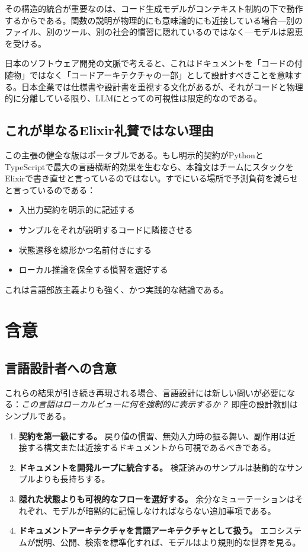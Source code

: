 \documentclass[11pt]{article}
\newcommand{\elixir}{Elixir}
\newcommand{\pythonlang}{Python}
\newcommand{\tslang}{TypeScript}
\begin{document}
その構造的統合が重要なのは、コード生成モデルがコンテキスト制約の下で動作するからである。関数の説明が物理的にも意味論的にも近接している場合---別のファイル、別のツール、別の社会的慣習に隠れているのではなく---モデルは恩恵を受ける\cite{zachdaniel}。

日本のソフトウェア開発の文脈で考えると、これはドキュメントを「コードの付随物」ではなく「コードアーキテクチャの一部」として設計すべきことを意味する。日本企業では仕様書や設計書を重視する文化があるが、それがコードと物理的に分離している限り、LLMにとっての可視性は限定的なのである。

\subsection{これが単なるElixir礼賛ではない理由}

この主張の健全な版はポータブルである。もし明示的契約が\pythonlang{}と\tslang{}で最大の言語横断的効果を生むなら、本論文はチームにスタックを\elixir{}で書き直せと言っているのではない。すでにいる場所で予測負荷を減らせと言っているのである：
\begin{itemize}
  \item 入出力契約を明示的に記述する
  \item サンプルをそれが説明するコードに隣接させる
  \item 状態遷移を線形かつ名前付きにする
  \item ローカル推論を保全する慣習を選好する
\end{itemize}

これは言語部族主義よりも強く、かつ実践的な結論である。

\section{含意}

\subsection{言語設計者への含意}

これらの結果が引き続き再現される場合、言語設計には新しい問いが必要になる：\emph{この言語はローカルビューに何を強制的に表示するか？} 即座の設計教訓はシンプルである。

\begin{enumerate}
  \item \textbf{契約を第一級にする。} 戻り値の慣習、無効入力時の振る舞い、副作用は近接する構文または近接するドキュメントから可視であるべきである。
  \item \textbf{ドキュメントを開発ループに統合する。} 検証済みのサンプルは装飾的なサンプルよりも長持ちする。
  \item \textbf{隠れた状態よりも可視的なフローを選好する。} 余分なミューテーションはそれぞれ、モデルが暗黙的に記憶しなければならない追加事項である。
  \item \textbf{ドキュメントアーキテクチャを言語アーキテクチャとして扱う。} エコシステムが説明、公開、検索を標準化すれば、モデルはより規則的な世界を見る。
\end{enumerate}
\end{document}
